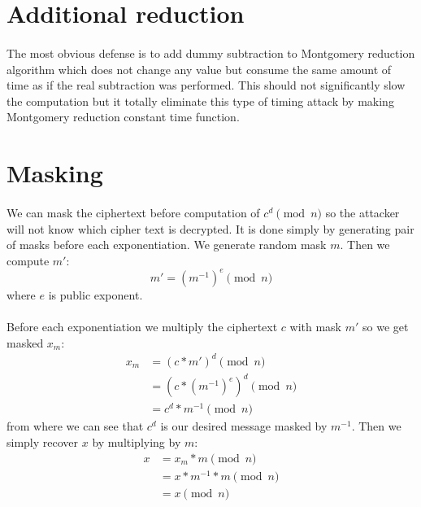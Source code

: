 \documentclass[thesis=B,english]{FITthesis}[2012/10/20]
\begin{document}
{\section{Additional reduction}
\paragraph*{}{
The most obvious defense is to add dummy subtraction to Montgomery reduction algorithm which does not change any value but consume the same amount of time as if the real subtraction
was performed. This should not significantly slow the computation but it totally eliminate this type of timing attack by making Montgomery reduction constant time function.
}

\section{Masking}
\paragraph*{}{
We can mask the ciphertext before computation of \(c^d \pmod{n}\) so the attacker will not know which cipher text is decrypted. It is done simply by generating pair of masks 
before each exponentiation. We generate random mask \(m\). Then we compute \(m'\):
\[ m' = (m^{-1})^e \pmod{n}\]
where \(e\) is public exponent.
}
\paragraph*{}
{Before each exponentiation we multiply the ciphertext \(c\) with mask \(m'\) so we get masked \(x_m\):
\begin{equation}
\begin{split}
 x_m & = (c*m')^d \pmod{n} \\
 & = (c * (m^{-1})^e)^d \pmod{n}  \\
 & = c^d * m^{-1} \pmod{n}
\end{split}
\end{equation}
from where we can see that \(c^d\) is our desired message masked by \(m^{-1}\). Then we simply recover \(x\) by multiplying by \(m\)\cite{Kocher1996}:
\begin{equation}
\begin{split}
 x & = x_m * m \pmod{n} \\
 & = x * m^{-1} * m \pmod{n}  \\
 & = x \pmod{n}
\end{split}
\end{equation}
}

}
\end{document}
